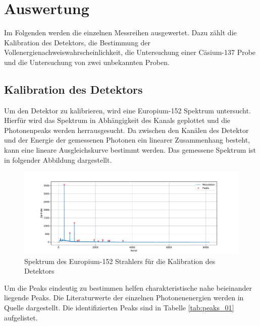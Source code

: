 \section{Auswertung}
\label{sec:Auswertung}
Im Folgenden werden die einzelnen Messreihen ausgewertet. Dazu zählt die Kalibration des Detektors, die Bestimmung der Vollenergienachweiswahrscheinlichkeit,
die Untersuchung einer Cäsium-137 Probe und die Untersuchung von zwei unbekannten Proben.
\subsection{Kalibration des Detektors}
Um den Detektor zu kalibrieren, wird eine Europium-152 Spektrum untersucht. Hierfür wird das Spektrum in Abhängigkeit des 
Kanals geplottet und die Photonenpeaks werden herrausgesucht. Da zwischen den Kanälen des Detektor und der Energie 
der gemessenen Photonen ein linearer Zusammenhang besteht, kann eine lineare Ausgleichskurve bestimmt werden.
Das gemessene Spektrum ist in folgender Abbildung dargestellt.
\FloatBarrier
\begin{figure}
  \centering
  \includegraphics[width = \textwidth,keepaspectratio]{figure/Peaks_01.pdf}
  \caption{Spektrum des Europium-152 Strahlers für die Kalibration des Detektors}
  \label{fig:Peaks_01}
\end{figure}
\FloatBarrier
Um die Peaks eindeutig zu bestimmen helfen charakteristische nahe beieinander liegende Peaks.
Die Literaturwerte der einzelnen Photonenenergien werden in Quelle \cite{Gamma_lit} dargestellt.
Die identifizierten Peaks sind in Tabelle \ref{tab:peaks_01} aufgelistet.
\FloatBarrier
